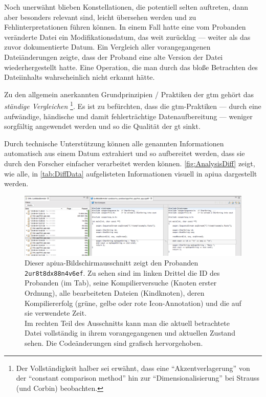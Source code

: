 Noch unerwähnt blieben Konstellationen, die potentiell selten auftreten, dann aber besonders relevant sind, leicht übersehen werden und zu Fehlinterpretationen führen können. In einem Fall hatte eine vom Probanden veränderte Datei ein Modifikationsdatum, das weit zurücklag --- weiter als das zuvor dokumentierte Datum. Ein Vergleich aller vorangegangenen Dateiänderungen zeigte, dass der Proband eine alte Version der Datei wiederhergestellt hatte. Eine Operation, die man durch das bloße Betrachten des Dateiinhalts wahrscheinlich nicht erkannt hätte. 

Zu den allgemein anerkannten Grundprinzipien / Praktiken der \gls{gtm} gehört das \textit{ständige Vergleichen} \citep{strauss1990basics,corbin2014basics,Salinger:2013vd,Glaser:1967ts}\footnote{Der Vollständigkeit halber sei erwähnt, dass \cite{Mey2007} eine ``Akzentverlagerung'' von der ``constant comparison method'' hin zur ``Dimensionalisierung'' bei Strauss (und Corbin) beobachten.}. Es ist zu befürchten, dass die \gls{gtm}-Praktiken --- durch eine aufwändige, händische und damit fehlerträchtige Datenaufbereitung --- weniger sorgfältig angewendet werden und so die Qualität der \gls{gt} sinkt.
  
Durch technische Unterstützung können alle genannten Informationen automatisch aus einem Datum extrahiert und so aufbereitet werden, dass sie durch den Forscher einfacher verarbeitet werden können. \autoref{fig:AnalysisDiff} zeigt, wie alle, in \autoref{tab:DiffData} aufgelisteten Informationen visuell in \gls{apiua} dargestellt werden.
  
\begin{figure}
  \centering
    \includegraphics[width=1.0\linewidth]{Figures/AnalysisDiff.png}
  \caption[Beispielhafte Diff-Datei]{Dieser \gls{apiua}-Bildschirmausschnitt zeigt den Probanden \texttt{2ur8t8dx88n4v6ef}. Zu sehen sind im linken Drittel die ID des Probanden (im Tab), seine Kompilierversuche (Knoten erster Ordnung), alle bearbeiteten Dateien (Kindknoten), deren Kompiliererfolg (grüne, gelbe oder rote Icon-Annotation) und die auf sie verwendete Zeit. \\Im rechten Teil des Ausschnitts kann man die aktuell betrachtete Datei vollständig in ihrem vorangegangenen und aktuellen Zustand sehen. Die Codeänderungen sind grafisch hervorgehoben.}
  \label{fig:AnalysisDiff}
\end{figure}



